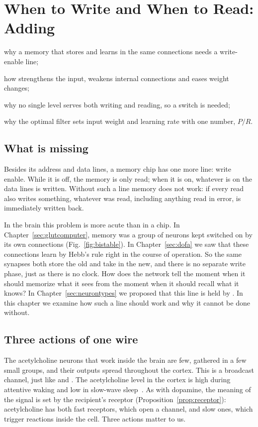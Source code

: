 \chapter{When to Write and When to Read: Adding }
\label{sec:acet}
\begin{chaptergoals}
\item why a memory that stores and learns in the same connections needs a write-enable line;
\item how  strengthens the input, weakens internal connections and eases weight changes;
\item why no single  level serves both writing and reading, so a switch is needed;
\item why the optimal filter sets input weight and learning rate with one number, $P/R$.
\end{chaptergoals}

\section{What is missing}

Besides its address and data lines, a memory chip has one more line: write enable. While it is off, the memory is only read; when it is on, whatever is on the data lines is written. Without such a line memory does not work: if every read also writes something, whatever was read, including anything read in error, is immediately written back.

In the brain this problem is more acute than in a chip. In Chapter~\ref{sec:glutcomputer}, memory was a group of  neurons kept switched on by its own connections (Fig.~\ref{fig:bistable}). In Chapter~\ref{sec:dofa} we saw that these connections learn by Hebb's rule right in the course of operation. So the same synapses both store the old and take in the new, and there is no separate write phase, just as there is no clock. How does the network tell the moment when it should memorize what it sees from the moment when it should recall what it knows? In Chapter~\ref{sec:neurontypes} we proposed that this line is held by . In this chapter we examine how such a line should work and why it cannot be done without.

\section{Three actions of one wire}

The acetylcholine neurons that work inside the brain are few, gathered in a few small groups, and their outputs spread throughout the cortex. This is a broadcast channel, just like  and . The acetylcholine level in the cortex is high during attentive waking and low in slow-wave sleep~\cite{Hasselmo1999}. As with dopamine, the meaning of the signal is set by the recipient's receptor (Proposition~\ref{prop:receptor}): acetylcholine has both fast receptors, which open a channel, and slow ones, which trigger reactions inside the cell. Three actions matter to us.

